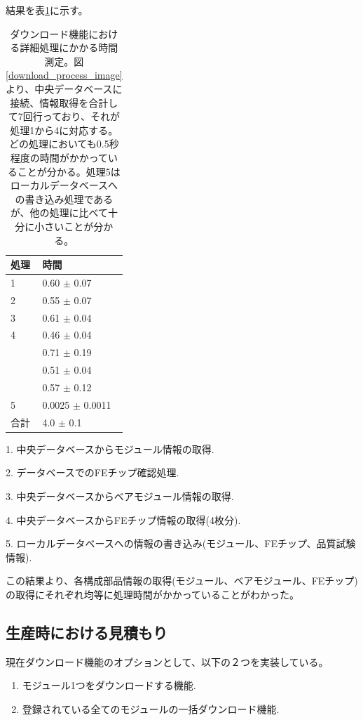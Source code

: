 結果を表\ref{download_process_details}に示す。
\begin{table}[tbp]
\begin{center}
\caption[ダウンロード機能における詳細処理にかかる時間測定]{ダウンロード機能における詳細処理にかかる時間測定。図\ref{download_process_image}より、中央データベースに接続、情報取得を合計して7回行っており、それが処理1から4に対応する。どの処理においても0.5秒程度の時間がかかっていることが分かる。処理5はローカルデータベースへの書き込み処理であるが、他の処理に比べて十分に小さいことが分かる。}
\label{download_process_details}
  \begin{tabular}{|ll|} \hline
    処理 & 時間 \\ \hline
    1 &  0.60 $\pm$ 0.07 \\ 
    2 &  0.55 $\pm$ 0.07 \\ 
    3 &  0.61 $\pm$ 0.04 \\ 
    4 &  0.46 $\pm$ 0.04 \\ 
      &  0.71 $\pm$ 0.19 \\ 
      &  0.51 $\pm$ 0.04 \\ 
      &  0.57 $\pm$ 0.12 \\ 
    5 &  0.0025 $\pm$ 0.0011 \\ 
    合計 & 4.0 $\pm$ 0.1 \\ \hline
  \end{tabular}
  \begin{tablenotes}
    \item[1] 1. 中央データベースからモジュール情報の取得.
    \item[2] 2. データベースでのFEチップ確認処理.
    \item[3] 3. 中央データベースからベアモジュール情報の取得.
    \item[4] 4. 中央データベースからFEチップ情報の取得(4枚分).
    \item[5] 5. ローカルデータベースへの情報の書き込み(モジュール、FEチップ、品質試験情報).
  \end{tablenotes}
\end{center}
\end{table}

この結果より、各構成部品情報の取得(モジュール、ベアモジュール、FEチップ)の取得にそれぞれ均等に処理時間がかかっていることがわかった。

\subsection{生産時における見積もり}
現在ダウンロード機能のオプションとして、以下の２つを実装している。
\begin{enumerate}
  \item モジュール1つをダウンロードする機能.
  \item 登録されている全てのモジュールの一括ダウンロード機能.
\end{enumerate}

